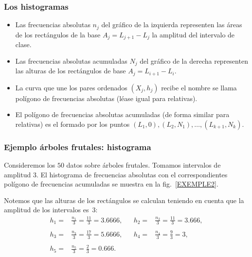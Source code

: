 \begin{frame}
\frametitle{Los histogramas}
\begin{itemize}
\item  Las frecuencias absolutas $n_j$ del gráfico de la
izquierda representen las áreas de los rectángulos de la base $A_j=L_{j+1}-L_j$ la amplitud del
intervalo de clase.
\item  Las frecuencias absolutas acumuladas $N_j$ del gráfico
de la derecha representen las alturas de los rectángulos de base $A_j=L_{i+1}-L_i$.
\item  La curva
 que une los pares ordenados $(X_j,h_j)$ recibe el nombre
  se llama  polígono de frecuencias absolutas (léase igual para relativas).
\item  El polígono de frecuencias absolutas acumuladas (de forma similar para relativas) es el formado por los puntos
  $(L_1,0),(L_2,N_1),\ldots,(L_{k+1},N_k)$.
\end{itemize}
\end{frame}

\begin{frame}
\frametitle{Ejemplo árboles frutales: histograma}
Consideremos los $50$ datos sobre árboles frutales. Tomamos
intervalos  de amplitud $3$. El histograma de frecuencias absolutas con el
correspondientes polígono de frecuencias acumuladas se muestra en la
fig.~\ref{EXEMPLE2}.

Notemos que las alturas de los rectángulos se calculan teniendo en cuenta que la amplitud
de los intervalos es~$3$:
\[
\begin{array}{rlcrl}
h_1 =& \frac{n_1}{3}=\frac{11}{3}=3.6666,& & h_2=& \frac{n_2}{3}= \frac{11}{3}=3.666,\\
&&&&\\ h_3 =& \frac{n_3}{3}=\frac{17}{3}=5.6666,& & h_4=& \frac{n_4}{3}= \frac{9}{3}=3,
\\ &&&&\\ h_5 = & \frac{n_5}{3}=\frac{2}{3}=0.666.&&&
\end{array}
\]
\end{frame}

